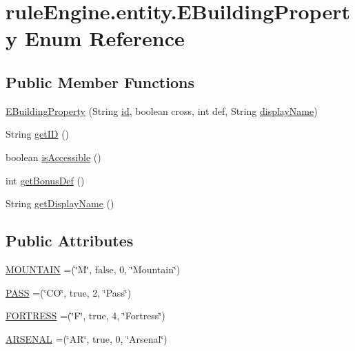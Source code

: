 \hypertarget{enumrule_engine_1_1entity_1_1_e_building_property}{}\section{rule\+Engine.\+entity.\+E\+Building\+Property Enum Reference}
\label{enumrule_engine_1_1entity_1_1_e_building_property}
\subsection*{Public Member Functions}
\begin{DoxyCompactItemize}
\item 
\mbox{\hyperlink{enumrule_engine_1_1entity_1_1_e_building_property_a41fd1926953e0d723daf32d31a36a987}{E\+Building\+Property}} (String \mbox{\hyperlink{enumrule_engine_1_1entity_1_1_e_building_property_aa10b24a146f5589f5a5715dc1753b37d}{id}}, boolean cross, int def, String \mbox{\hyperlink{enumrule_engine_1_1entity_1_1_e_building_property_abcbd4fa6897a37886fd0f92e7d322e91}{display\+Name}})
\item 
String \mbox{\hyperlink{enumrule_engine_1_1entity_1_1_e_building_property_aea4201c544b7f092b58fa4e53bd095dc}{get\+ID}} ()
\item 
boolean \mbox{\hyperlink{enumrule_engine_1_1entity_1_1_e_building_property_a4897fdf509002eb7cd5c1b1b5c8f10fe}{is\+Accessible}} ()
\item 
int \mbox{\hyperlink{enumrule_engine_1_1entity_1_1_e_building_property_a65d0295002f2e355b4599132104d3314}{get\+Bonus\+Def}} ()
\item 
String \mbox{\hyperlink{enumrule_engine_1_1entity_1_1_e_building_property_af8fbe5d8bcbd5bd7c1c017bdfcd15d1d}{get\+Display\+Name}} ()
\end{DoxyCompactItemize}
\subsection*{Public Attributes}
\begin{DoxyCompactItemize}
\item 
\mbox{\hyperlink{enumrule_engine_1_1entity_1_1_e_building_property_a7b880540197f74712e64f8086dc2e3ab}{M\+O\+U\+N\+T\+A\+IN}} =(\char`\"{}M\char`\"{}, false, 0, \char`\"{}Mountain\char`\"{})
\item 
\mbox{\hyperlink{enumrule_engine_1_1entity_1_1_e_building_property_a8e3a81629f3f078dc9091472049fe9c3}{P\+A\+SS}} =(\char`\"{}CO\char`\"{}, true, 2, \char`\"{}Pass\char`\"{})
\item 
\mbox{\hyperlink{enumrule_engine_1_1entity_1_1_e_building_property_a3d89927caa64699dca5e997aeb1ac08f}{F\+O\+R\+T\+R\+E\+SS}} =(\char`\"{}F\char`\"{}, true, 4, \char`\"{}Fortress\char`\"{})
\item 
\mbox{\hyperlink{enumrule_engine_1_1entity_1_1_e_building_property_a99acab300ba5dd1677f24f83ed1b2ae0}{A\+R\+S\+E\+N\+AL}} =(\char`\"{}AR\char`\"{}, true, 0, \char`\"{}Arsenal\char`\"{})
\end{DoxyCompactItemize}
